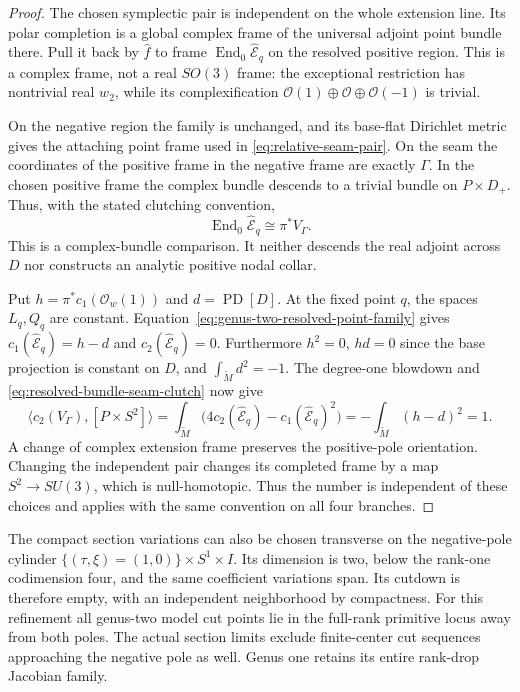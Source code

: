 \documentclass[11pt]{amsart}
\theoremstyle{definition}
\theoremstyle{remark}
\theoremstyle{plain}
\begin{document}
\begin{proof}
The chosen symplectic pair is independent on the whole
extension line. Its polar completion is a global complex
frame of the universal adjoint point bundle there.
Pull it back by $\widehat f$ to frame
$\operatorname{End}_0\widehat{\mathcal E}_q$ on the resolved
positive region. This is a complex frame, not a real
$SO(3)$ frame: the exceptional restriction has nontrivial
real $w_2$, while its complexification
$\mathcal O(1)\oplus\mathcal O\oplus\mathcal O(-1)$ is trivial.

On the negative region the family is unchanged, and its
base-flat Dirichlet metric gives the attaching point frame
used in \eqref{eq:relative-seam-pair}. On the seam the
coordinates of the positive frame in the negative frame
are exactly $\Gamma$. In the chosen positive frame the
complex bundle descends to a trivial bundle on
$P\times D_+$. Thus, with the stated clutching convention,
\begin{equation}\label{eq:resolved-bundle-seam-clutch}
       \operatorname{End}_0\widehat{\mathcal E}_q
                                      \cong\pi^*V_\Gamma.
\end{equation}
This is a complex-bundle comparison. It neither descends
the real adjoint across $D$ nor constructs an analytic
positive nodal collar.

Put $h=\pi^*c_1(\mathcal O_w(1))$ and $d=\operatorname{PD}[D]$.
At the fixed point $q$, the spaces $L_q,Q_q$ are constant.
Equation~\eqref{eq:genus-two-resolved-point-family} gives
$c_1(\widehat{\mathcal E}_q)=h-d$ and
$c_2(\widehat{\mathcal E}_q)=0$. Furthermore $h^2=0$,
$hd=0$ since the base projection is constant on $D$,
and $\int_{\widetilde M}d^2=-1$.
The degree-one blowdown and
\eqref{eq:resolved-bundle-seam-clutch} now give
\[
 \langle c_2(V_\Gamma),[P\times S^2]\rangle
   =\int_{\widetilde M}
       \bigl(4c_2(\widehat{\mathcal E}_q)
                        -c_1(\widehat{\mathcal E}_q)^2\bigr)
   =-\int_{\widetilde M}(h-d)^2=1.
\]
A change of complex extension frame preserves the positive-pole
orientation. Changing the independent pair changes its completed
frame by a map $S^2\to SU(3)$, which is null-homotopic.
Thus the number is independent of these choices and applies
with the same convention on all four branches.
\end{proof}

The compact section variations can also be chosen transverse on
the negative-pole cylinder $\{(\tau,\xi)=(1,0)\}\times S^1\times I$.
Its dimension is two, below the rank-one codimension four, and
the same coefficient variations span. Its cutdown is therefore
empty, with an independent neighborhood by compactness.
For this refinement all genus-two model cut points lie in the
full-rank primitive locus away from both poles. The actual section
limits exclude finite-center cut sequences approaching the negative
pole as well. Genus one retains its entire rank-drop Jacobian family.
\end{document}
